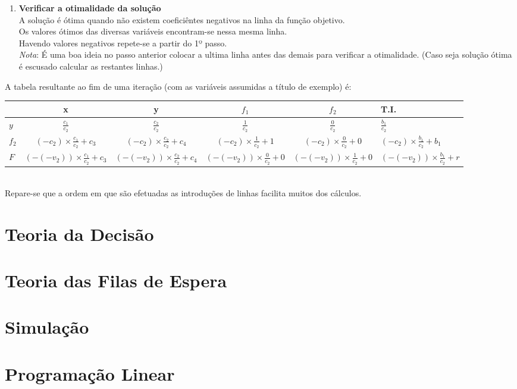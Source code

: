 \documentclass[]{report}
\begin{document}
\begin{enumerate}
\begin{itemize}
\end{itemize}
\item \textbf{Verificar a otimalidade da solução}\\
A solução é ótima quando não existem coeficiêntes negativos na linha da função objetivo.\\
Os valores ótimos das diversas variáveis encontram-se nessa mesma linha.\\
Havendo valores negativos repete-se a partir do 1º passo.\\
\textit{Nota}: É uma boa ideia no passo anterior colocar a ultima linha antes das demais para verificar a otimalidade. (Caso seja solução ótima é escusado calcular as restantes linhas.)
\end{enumerate}
A tabela resultante ao fim de uma iteração (com as variáveis assumidas a título de exemplo) é:\\
\begin{tabular}{l|cccc	|l}
      & x & y & $f_1$ & $f_2$ & T.I.\\\hline
$y$ & $\frac{c_1}{c_2}$ & $\frac{c_2}{c_2}$ & $\frac{1}{c_2}$ & $\frac{0}{c_2}$ & $\frac{b_1}{c_2}$\\
$f_2$ & $(-c_2) \times \frac{c_1}{c_2} + c_3 $ & $(-c_2) \times \frac{c_2}{c_2} + c_4$ & $(-c_2) \times \frac{1}{c_2} + 1$ & $(-c_2) \times \frac{0}{c_2} + 0$ & $(-c_2) \times \frac{b_1}{c_2} + b_1$\\\hline
$F$ & $(-(-v_2)) \times \frac{c_1}{c_2} + c_3 $ & $(-(-v_2)) \times \frac{c_2}{c_2} + c_4$ & $(-(-v_2)) \times \frac{0}{c_2} + 0$ & $(-(-v_2)) \times \frac{1}{c_2} + 0$ & $(-(-v_2)) \times \frac{b_1}{c_2} + r$
\end{tabular}\\
Repare-se que a ordem em que são efetuadas as introduções de linhas facilita muitos dos cálculos.

\chapter{Teoria da Decisão}
\chapter{Teoria das Filas de Espera}
\chapter{Simulação}
\chapter{Programação Linear}
\end{document}
